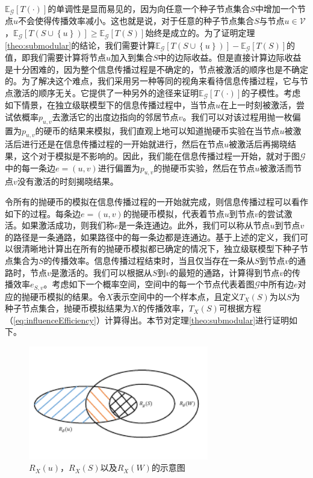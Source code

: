 $\mathbb{E}_\mathcal{G}\left[T\left(\cdot\right)\right]$的单调性是显而易见的，因为向任意一个种子节点集合$S$中增加一个节点$u$不会使得传播效率减小。这也就是说，对于任意的种子节点集合$S$与节点$u \in \mathcal{V}$，$\mathbb{E}_\mathcal{G}\left[T\left( S \cup \left\{u\right\} \right)\right] \geq \mathbb{E}_\mathcal{G}\left[T\left(S\right)\right]$始终是成立的。为了证明定理\ref{theo:submodular}的结论，我们需要计算$\mathbb{E}_\mathcal{G}\left[T\left( S \cup \left\{u\right\} \right)\right] - \mathbb{E}_\mathcal{G}\left[T\left(S\right)\right]$的值，即我们需要计算将节点$u$加入到集合$S$中的边际收益。但是直接计算边际收益是十分困难的，因为整个信息传播过程是不确定的，节点被激活的顺序也是不确定的。为了解决这个难点，我们采用另一种等同的视角来看待信息传播过程，它与节点激活的顺序无关。它提供了一种另外的途径来证明$\mathbb{E}_\mathcal{G}\left[T\left(\cdot\right)\right]$的子模性。考虑如下情景，在独立级联模型下的信息传播过程中，当节点$u$在上一时刻被激活，尝试依概率$p_{u,v}$去激活它的出度边指向的邻居节点$v$。我们可以对该过程用抛一枚偏置为$p_{u,v}$的硬币的结果来模拟，我们直观上地可以知道抛硬币实验在当节点$u$被激活后进行还是在信息传播过程的一开始就进行，然后在节点$u$被激活后再揭晓结果，这个对于模拟是不影响的。因此，我们能在信息传播过程一开始，就对于图$\mathcal{G}$中的每一条边$e=\left(u,v\right)$进行偏置为$p_{u,v}$的抛硬币实验，然后在节点$u$被激活而节点$v$没有激活的时刻揭晓结果。

令所有的抛硬币的模拟在信息传播过程的一开始就完成，则信息传播过程可以看作如下的过程。每条边$e=\left(u,v\right)$的抛硬币模拟，代表着节点$u$到节点$v$的尝试激活。如果激活成功，则我们称$e$是一条连通边。此外，我们可以称从节点$u$到节点$v$的路径是一条通路，如果路径中的每一条边都是连通边。基于上述的定义，我们可以很清晰地计算出在所有的抛硬币模拟都已确定的情况下，独立级联模型下种子节点集合为$S$的传播效率。信息传播过程结束时，当且仅当存在一条从$S$到节点$v$的通路时，节点$v$是激活的。我们可以根据从$S$到$v$的最短的通路，计算得到节点$v$的传播效率$e_{S,v}$。考虑如下一个概率空间，空间中的每一个节点代表着图$\mathcal{G}$中所有边$e$对应的抛硬币模拟的结果。令$X$表示空间中的一个样本点，且定义$T_X\left(S\right)$为以$S$为种子节点集合，抛硬币模拟结果为$X$的传播效率，$T_X\left(S\right)$可根据方程（\ref{eq:influenceEfficiency}）计算得出。本节对定理\ref{theo:submodular}进行证明如下。

\begin{figure}[!ht]
    \centering
    \includegraphics[width=0.7\textwidth]{figures/submodular.pdf}
    \caption{$R_X\left(u\right)$，$R_X\left(S\right)$以及$R_X\left(W\right)$的示意图}
    \label{fig:submodular}
\end{figure}

